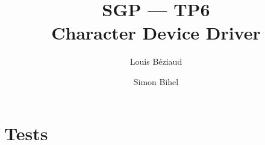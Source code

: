 \documentclass[a4paper,11pt,english]{article}
\title{SGP --- TP6\\Character Device Driver}
\author{Louis Béziaud \and Simon Bihel}
\begin{document}
\maketitle

\section{Tests}

\begin{minipage}[t]{0.45\linewidth}

\end{minipage}
\hfill
\begin{minipage}[t]{0.45\linewidth}

\end{minipage}

\begin{minipage}[t]{0.45\linewidth}

\end{minipage}
\hfill
\begin{minipage}[t]{0.45\linewidth}

\end{minipage}
\end{document}
